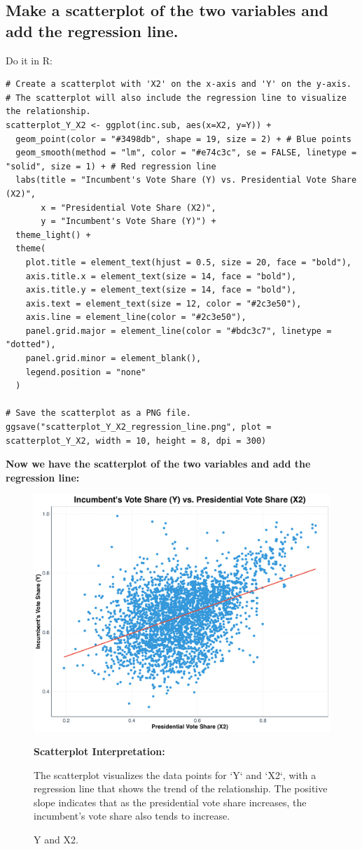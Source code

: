 \documentclass[12pt]{article}
\begin{document}
\subsection{Make a scatterplot of the two variables and add the regression line.}
Do it in R:
\begin{lstlisting}
# Create a scatterplot with 'X2' on the x-axis and 'Y' on the y-axis.
# The scatterplot will also include the regression line to visualize the relationship.
scatterplot_Y_X2 <- ggplot(inc.sub, aes(x=X2, y=Y)) +
  geom_point(color = "#3498db", shape = 19, size = 2) + # Blue points
  geom_smooth(method = "lm", color = "#e74c3c", se = FALSE, linetype = "solid", size = 1) + # Red regression line
  labs(title = "Incumbent's Vote Share (Y) vs. Presidential Vote Share (X2)",
       x = "Presidential Vote Share (X2)",
       y = "Incumbent's Vote Share (Y)") +
  theme_light() +
  theme(
    plot.title = element_text(hjust = 0.5, size = 20, face = "bold"),
    axis.title.x = element_text(size = 14, face = "bold"),
    axis.title.y = element_text(size = 14, face = "bold"),
    axis.text = element_text(size = 12, color = "#2c3e50"),
    axis.line = element_line(color = "#2c3e50"),
    panel.grid.major = element_line(color = "#bdc3c7", linetype = "dotted"),
    panel.grid.minor = element_blank(),
    legend.position = "none"
  )

# Save the scatterplot as a PNG file.
ggsave("scatterplot_Y_X2_regression_line.png", plot = scatterplot_Y_X2, width = 10, height = 8, dpi = 300)
\end{lstlisting}
\textbf{Now we have the scatterplot of the two variables and add the regression line:}
\begin{figure}[h!]
    \centering
    \includegraphics[width=.75\textwidth]{scatterplot_Y_X2_regression_line.png}
    \caption{\footnotesize Y and X2.}
    \label{fig:plot_3}
    \smallskip
    \raggedright
    \textbf{Scatterplot Interpretation:}
    
    The scatterplot visualizes the data points for `Y` and `X2`, with a regression line that shows the trend of the relationship. The positive slope indicates that as the presidential vote share increases, the incumbent's vote share also tends to increase.
\end{figure} 
\newpage
\end{document}
